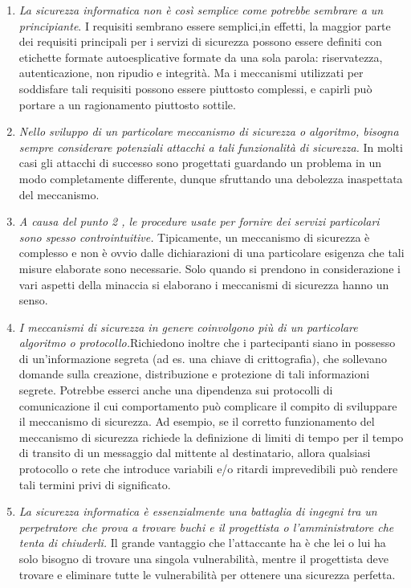 \begin{enumerate}
    \item \textit{La sicurezza informatica non è così semplice come potrebbe sembrare a un principiante}. I requisiti sembrano essere semplici,in effetti, la maggior parte dei requisiti principali per i servizi di sicurezza possono essere definiti con etichette formate autoesplicative formate da una sola parola: riservatezza, autenticazione, non ripudio e integrità. Ma i meccanismi utilizzati per soddisfare tali requisiti possono essere piuttosto complessi, e capirli può portare a un ragionamento piuttosto sottile.
    \item \textit{Nello sviluppo di un particolare meccanismo di sicurezza o algoritmo, bisogna sempre considerare potenziali attacchi a tali funzionalità di sicurezza.} In molti casi gli attacchi di successo sono progettati guardando un problema in un modo completamente differente, dunque sfruttando una debolezza inaspettata del meccanismo.
    \item \textit{A causa del punto 2 , le procedure usate per fornire dei servizi particolari sono spesso controintuitive.} Tipicamente, un meccanismo di sicurezza è complesso e non è ovvio dalle dichiarazioni di una particolare esigenza che tali misure elaborate sono necessarie. Solo quando si prendono in considerazione i vari aspetti della minaccia si elaborano i meccanismi di sicurezza hanno un senso.
    \item \textit{I meccanismi di sicurezza in genere coinvolgono più di un particolare algoritmo o
    protocollo.}Richiedono inoltre che i partecipanti siano in possesso di un'informazione segreta (ad es. una chiave di crittografia), che sollevano domande sulla creazione, distribuzione e protezione di tali informazioni segrete. Potrebbe esserci anche una dipendenza sui protocolli di comunicazione il cui comportamento può complicare il compito di sviluppare il meccanismo di sicurezza. Ad esempio, se il corretto funzionamento del meccanismo di sicurezza richiede la definizione di limiti di tempo per il tempo di transito di un messaggio dal mittente al destinatario, allora qualsiasi protocollo o rete che introduce variabili e/o ritardi imprevedibili può rendere tali termini privi di significato.
    \item \textit{ La sicurezza informatica è essenzialmente una battaglia di ingegni tra un perpetratore che prova a  trovare buchi e il progettista o l'amministratore che tenta di chiuderli.} Il grande vantaggio che l'attaccante ha è che lei o lui ha solo bisogno di trovare una singola vulnerabilità, mentre il progettista deve trovare e eliminare tutte le vulnerabilità per ottenere una sicurezza perfetta.

\end{enumerate}
